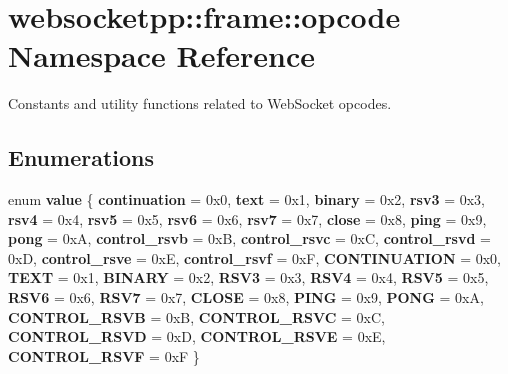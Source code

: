 \hypertarget{namespacewebsocketpp_1_1frame_1_1opcode}{}\section{websocketpp\+:\+:frame\+:\+:opcode Namespace Reference}
\label{namespacewebsocketpp_1_1frame_1_1opcode}


Constants and utility functions related to Web\+Socket opcodes.  


\subsection*{Enumerations}
\begin{DoxyCompactItemize}
\item 
\mbox{\label{namespacewebsocketpp_1_1frame_1_1opcode_ae68711643096dfc4af6d66ade3f9fd5e}} 
enum {\bfseries value} \{ \newline
{\bfseries continuation} = 0x0, 
{\bfseries text} = 0x1, 
{\bfseries binary} = 0x2, 
{\bfseries rsv3} = 0x3, 
\newline
{\bfseries rsv4} = 0x4, 
{\bfseries rsv5} = 0x5, 
{\bfseries rsv6} = 0x6, 
{\bfseries rsv7} = 0x7, 
\newline
{\bfseries close} = 0x8, 
{\bfseries ping} = 0x9, 
{\bfseries pong} = 0xA, 
{\bfseries control\+\_\+rsvb} = 0xB, 
\newline
{\bfseries control\+\_\+rsvc} = 0xC, 
{\bfseries control\+\_\+rsvd} = 0xD, 
{\bfseries control\+\_\+rsve} = 0xE, 
{\bfseries control\+\_\+rsvf} = 0xF, 
\newline
{\bfseries C\+O\+N\+T\+I\+N\+U\+A\+T\+I\+ON} = 0x0, 
{\bfseries T\+E\+XT} = 0x1, 
{\bfseries B\+I\+N\+A\+RY} = 0x2, 
{\bfseries R\+S\+V3} = 0x3, 
\newline
{\bfseries R\+S\+V4} = 0x4, 
{\bfseries R\+S\+V5} = 0x5, 
{\bfseries R\+S\+V6} = 0x6, 
{\bfseries R\+S\+V7} = 0x7, 
\newline
{\bfseries C\+L\+O\+SE} = 0x8, 
{\bfseries P\+I\+NG} = 0x9, 
{\bfseries P\+O\+NG} = 0xA, 
{\bfseries C\+O\+N\+T\+R\+O\+L\+\_\+\+R\+S\+VB} = 0xB, 
\newline
{\bfseries C\+O\+N\+T\+R\+O\+L\+\_\+\+R\+S\+VC} = 0xC, 
{\bfseries C\+O\+N\+T\+R\+O\+L\+\_\+\+R\+S\+VD} = 0xD, 
{\bfseries C\+O\+N\+T\+R\+O\+L\+\_\+\+R\+S\+VE} = 0xE, 
{\bfseries C\+O\+N\+T\+R\+O\+L\+\_\+\+R\+S\+VF} = 0xF
 \}
\end{DoxyCompactItemize}
